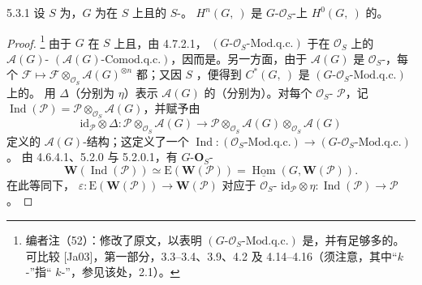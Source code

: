 \begin{SGAresult}{}{5.3.1}
设 $S$ 为，$G$ 为在 $S$ 上且的 $S$-。 $H^n(G,\ )$ 是 $G$-$\mathcal O_S$-上 $H^0(G,\ )$ 的。
\end{SGAresult}
\begin{proof}
\footnote{编者注（52）：修改了原文，以表明 $(G\text{-}\mathcal O_S\text{-}\mathrm{Mod.q.c.})$ 是，并有足够多的。可比较 [Ja03]，第一部分，3.3--3.4、3.9、4.2 及 4.14--4.16（须注意，其中“$k$-”指“ $k$-”，参见该处，2.1）。} 由于 $G$ 在 $S$ 上且，由 4.7.2.1， $(G\text{-}\mathcal O_S\text{-}\mathrm{Mod.q.c.})$ 于在 $\mathcal O_S$ 上的 $\mathcal A(G)$- $(\mathcal A(G)\text{-}\mathrm{Comod.q.c.})$，因而是。另一方面，由于 $\mathcal A(G)$ 是 $\mathcal O_S$-，每个 $\mathcal F\mapsto\mathcal F\otimes_{\mathcal O_S}\mathcal A(G)^{\otimes n}$ 都；又因 $S$ ，便得到 $C^*(G,\ )$ 是 $(G\text{-}\mathcal O_S\text{-}\mathrm{Mod.q.c.})$ 上的。
用 $\Delta$（分别为 $\eta$）表示 $\mathcal A(G)$ 的（分别为）。对每个 $\mathcal O_S$- $\mathcal P$，记 $\operatorname{Ind}(\mathcal P)=\mathcal P\otimes_{\mathcal O_S}\mathcal A(G)$，并赋予由
\[
\mathrm{id}_{\mathcal P}\otimes\Delta:\mathcal P\otimes_{\mathcal O_S}\mathcal A(G)\longrightarrow\mathcal P\otimes_{\mathcal O_S}\mathcal A(G)\otimes_{\mathcal O_S}\mathcal A(G)
\]
定义的 $\mathcal A(G)$-结构；这定义了一个 $\operatorname{Ind}:(\mathcal O_S\text{-}\mathrm{Mod.q.c.})\to(G\text{-}\mathcal O_S\text{-}\mathrm{Mod.q.c.})$。
由 4.6.4.1、5.2.0 与 5.2.0.1，有 $G$-$\mathbf O_S$-
\[
\mathbf W(\operatorname{Ind}(\mathcal P))\simeq\mathrm E(\mathbf W(\mathcal P))=\underline{\operatorname{Hom}}(G,\mathbf W(\mathcal P)).\tag{*}
\]
在此等同下， $\varepsilon:\mathrm E(\mathbf W(\mathcal P))\to\mathbf W(\mathcal P)$ 对应于 $\mathcal O_S$- $\mathrm{id}_{\mathcal P}\otimes\eta:\operatorname{Ind}(\mathcal P)\to\mathcal P$。

\end{proof}
